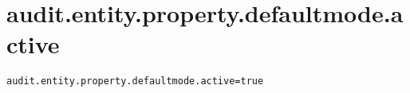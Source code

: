 \section{audit.entity.property.defaultmode.active}
\label{configuration:AuditEntityPropertyDefaultmodeActive}
\AvailableInJavaOnly{\TODO}
\begin{lstlisting}[style=Props,caption={Usage example for \textit{audit.entity.property.defaultmode.active}}]
audit.entity.property.defaultmode.active=true
\end{lstlisting}